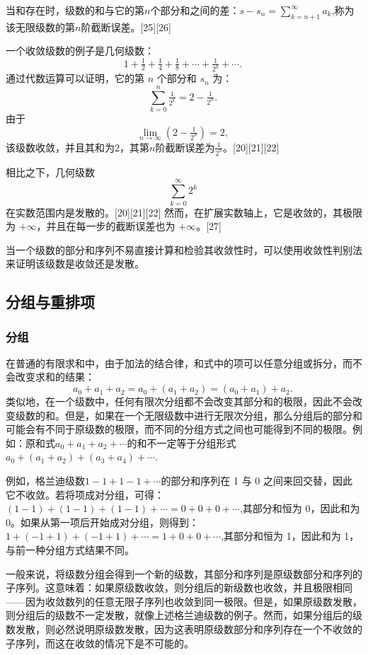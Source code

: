 当和存在时，级数的和与它的第$n$个部分和之间的差：$s - s_{n} = \sum_{k=n+1}^{\infty} a_{k}$,称为该无限级数的第$n$阶截断误差。[25][26]

一个收敛级数的例子是几何级数：
$$
1 + \tfrac{1}{2} + \tfrac{1}{4} + \tfrac{1}{8} + \cdots + \tfrac{1}{2^{k}} + \cdots .~
$$
通过代数运算可以证明，它的第 $n$ 个部分和 $s_{n}$ 为：
$$
\sum_{k=0}^{n} \tfrac{1}{2^{k}} = 2 - \tfrac{1}{2^{n}} .~
$$
由于
$$
\lim_{n \to \infty} \left( 2 - \tfrac{1}{2^{n}} \right) = 2 ,~
$$
该级数收敛，并且其和为$2$，其第$n$阶截断误差为$\tfrac{1}{2^{n}}$。[20][21][22]

相比之下，几何级数
$$
\sum_{k=0}^{\infty} 2^{k}~
$$
在实数范围内是发散的。[20][21][22] 然而，在扩展实数轴上，它是收敛的，其极限为 $+\infty$，并且在每一步的截断误差也为 $+\infty$。[27]

当一个级数的部分和序列不易直接计算和检验其收敛性时，可以使用收敛性判别法来证明该级数是收敛还是发散。
\subsection{分组与重排项}
\subsubsection{分组}
在普通的有限求和中，由于加法的结合律，和式中的项可以任意分组或拆分，而不会改变求和的结果：
$$
a_{0} + a_{1} + a_{2} 
= a_{0} + (a_{1} + a_{2}) 
= (a_{0} + a_{1}) + a_{2}.~
$$
类似地，在一个级数中，任何有限次分组都不会改变其部分和的极限，因此不会改变级数的和。但是，如果在一个无限级数中进行无限次分组，那么分组后的部分和可能会有不同于原级数的极限，而不同的分组方式之间也可能得到不同的极限。例如：原和式$a_{0} + a_{1} + a_{2} + \cdots$的和不一定等于分组形式$a_{0} + (a_{1}+a_{2}) + (a_{3}+a_{4}) + \cdots $.

例如，格兰迪级数$1 - 1 + 1 - 1 + \cdots$的部分和序列在 1 与 0 之间来回交替，因此它不收敛。若将项成对分组，可得：$(1-1) + (1-1) + (1-1) + \cdots = 0 + 0 + 0 + \cdots $,其部分和恒为 0，因此和为 0。如果从第一项后开始成对分组，则得到：$1 + (-1+1) + (-1+1) + \cdots = 1 + 0 + 0 + \cdots $,其部分和恒为 1，因此和为 1，与前一种分组方式结果不同。

一般来说，将级数分组会得到一个新的级数，其部分和序列是原级数部分和序列的子序列。这意味着：如果原级数收敛，则分组后的新级数也收敛，并且极限相同——因为收敛数列的任意无限子序列也收敛到同一极限。但是，如果原级数发散，则分组后的级数不一定发散，就像上述格兰迪级数的例子。然而，如果分组后的级数发散，则必然说明原级数发散，因为这表明原级数部分和序列存在一个不收敛的子序列，而这在收敛的情况下是不可能的。


